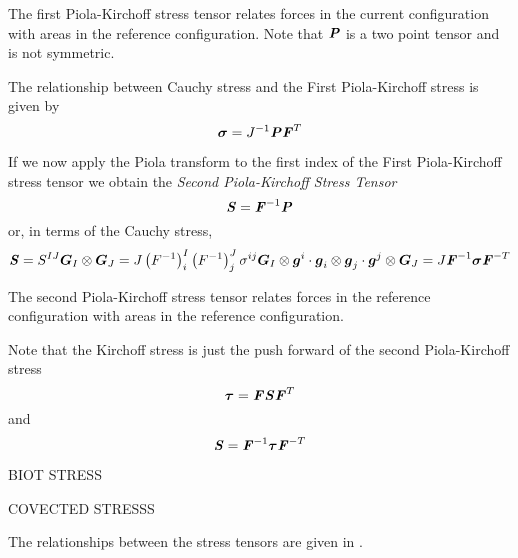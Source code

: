 The first Piola-Kirchoff stress tensor relates forces in the current
configuration with areas in the reference configuration. Note that
$\boldsymbol{\mathit{P}}$ is a two point tensor and is not symmetric.

The relationship between Cauchy stress and the First Piola-Kirchoff stress is
given by
\begin{equation}
  \boldsymbol{\mathit{\sigma}}={J}^{-1}\boldsymbol{\mathit{P}}{\boldsymbol{\mathit{F}}}^{T}
\end{equation}

If we now apply the Piola transform to the first index of the First Piola-Kirchoff stress tensor we obtain
the \emph{Second Piola-Kirchoff Stress Tensor} \ie{}
\begin{equation}
  \boldsymbol{\mathit{S}}={\boldsymbol{\mathit{F}}}^{-1}\boldsymbol{\mathit{P}}
\end{equation}
or, in terms of the Cauchy stress,
\begin{equation}
  \boldsymbol{\mathit{S}}=S^{IJ} \boldsymbol{G}_{I} \otimes \boldsymbol{G}_{J} =J\left( {F}^{-1} \right)^{I}_{i}\left( {F}^{-1} \right)^{J}_{j}\sigma^{ij} \boldsymbol{G}_{I} \otimes \boldsymbol{g}^{i} \cdot \boldsymbol{g}_{i} \otimes \boldsymbol{g}_{j} \cdot \boldsymbol{g}^{j} \otimes \boldsymbol{G}_{J} =J{\boldsymbol{\mathit{F}}}^{-1}\boldsymbol{\mathit{\sigma}} {\boldsymbol{\mathit{F}}}^{-T} 
\end{equation}

The second Piola-Kirchoff stress tensor relates forces in the reference
configuration with areas in the reference configuration.

Note that the Kirchoff stress is just the push forward of the second
Piola-Kirchoff stress \ie
\begin{equation}
  \boldsymbol{\mathit{\tau}}=\boldsymbol{\mathit{F}}\boldsymbol{\mathit{S}}{\boldsymbol{\mathit{F}}}^{T}
\end{equation}
and
\begin{equation}
  \boldsymbol{\mathit{S}}={\boldsymbol{\mathit{F}}}^{-1}\boldsymbol{\mathit{\tau}} {\boldsymbol{\mathit{F}}}^{-T} 
\end{equation}

BIOT STRESS

COVECTED STRESSS


The relationships between the stress tensors are given in .

